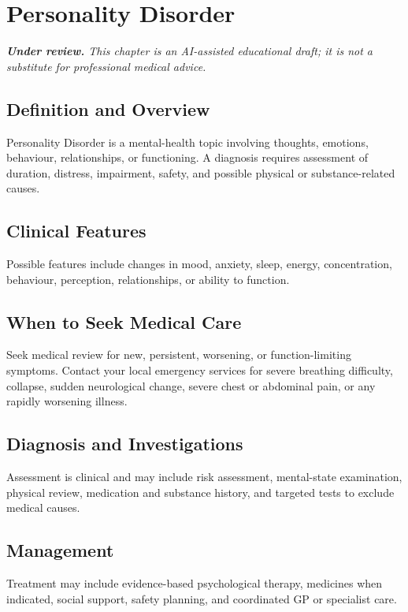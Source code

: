 \chapter{Personality Disorder}

\medskip
\noindent\textit{\textbf{Under review.} This chapter is an AI-assisted educational draft; it is not a substitute for professional medical advice.}

\section*{Definition and Overview}
Personality Disorder is a mental-health topic involving thoughts, emotions, behaviour, relationships, or functioning. A diagnosis requires assessment of duration, distress, impairment, safety, and possible physical or substance-related causes.

\section*{Clinical Features}
Possible features include changes in mood, anxiety, sleep, energy, concentration, behaviour, perception, relationships, or ability to function.

\section*{When to Seek Medical Care}
Seek medical review for new, persistent, worsening, or function-limiting symptoms. Contact your local emergency services for severe breathing difficulty, collapse, sudden neurological change, severe chest or abdominal pain, or any rapidly worsening illness.

\section*{Diagnosis and Investigations}
Assessment is clinical and may include risk assessment, mental-state examination, physical review, medication and substance history, and targeted tests to exclude medical causes.

\section*{Management}
Treatment may include evidence-based psychological therapy, medicines when indicated, social support, safety planning, and coordinated GP or specialist care.

